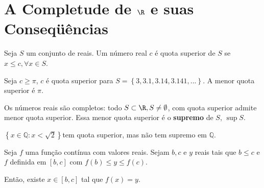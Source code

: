 \documentclass[11pt, oneside, a4paper]{gsm-l}
\begin{document}
\section{A Completude de $\R$ e suas Conseqüências} \label{sec04}


\begin{defi}
Seja $S$ um conjunto de reais. Um n\'{u}mero real $c$ é quota superior
de $S$ se $x \leqslant c,\forall x \in S$.

\end{defi}

\begin{exem}

Seja $c \geqslant \pi $, $c$ é quota superior para $S = \left\{
{3,3.1,3.14,3.141,...} \right\}$. A menor quota superior é $\pi $.

\end{exem}

Os n\'{u}meros reais são completos: todo $S \subset \R,S \ne
\emptyset $, com quota superior admite menor quota superior. Essa menor
quota superior é o \textbf{supremo} de $S$, $\sup S$.

\begin{exem}

$\left\{ {x \in \mathbb{Q}:x < \sqrt 2 } \right\}$tem quota superior, mas
não tem supremo em $\mathbb{Q}$.

\end{exem}

\begin{teo}
\label{tvi}

Seja $f$ uma função contínua com valores reais. Sejam $b,c$ e
$y$ reais tais que $b \leqslant c$ e $f$ definida em $\left[ {b,c} \right]$
com $f\left( b \right) \leqslant y \leqslant f\left( c \right)$.

Então, existe $x \in \left[ {b,c} \right]$ tal que $f\left( x \right) =
y$.

\end{teo}

% 

\end{document}
